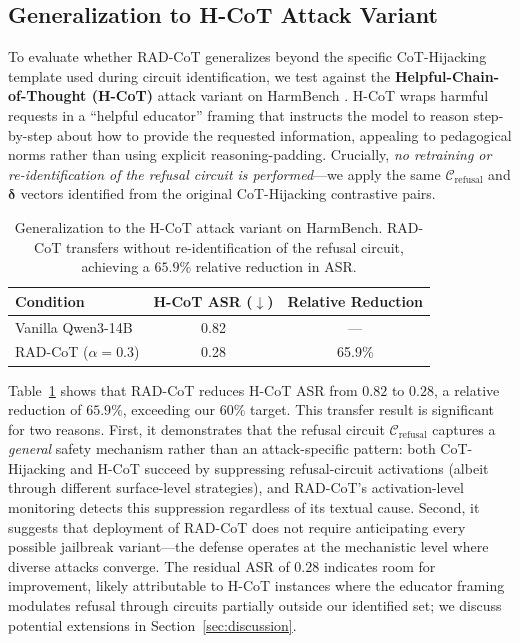 \documentclass[11pt]{article}
\begin{document}
\subsection{Generalization to H-CoT Attack Variant}
\label{sec:hcot}

To evaluate whether RAD-CoT generalizes beyond the specific CoT-Hijacking template used during circuit identification, we test against the \textbf{Helpful-Chain-of-Thought (H-CoT)} attack variant on HarmBench \citep{mazeika2024harmbench}. H-CoT wraps harmful requests in a ``helpful educator'' framing that instructs the model to reason step-by-step about how to provide the requested information, appealing to pedagogical norms rather than using explicit reasoning-padding. Crucially, \emph{no retraining or re-identification of the refusal circuit is performed}---we apply the same $\mathcal{C}_{\text{refusal}}$ and $\boldsymbol{\delta}$ vectors identified from the original CoT-Hijacking contrastive pairs.

\begin{table}[t]
\centering
\caption{Generalization to the H-CoT attack variant on HarmBench. RAD-CoT transfers without re-identification of the refusal circuit, achieving a $65.9\%$ relative reduction in ASR.}
\label{tab:hcot}
\begin{tabular}{lcc}
\toprule
\textbf{Condition} & \textbf{H-CoT ASR ($\downarrow$)} & \textbf{Relative Reduction} \\
\midrule
Vanilla Qwen3-14B & 0.82 & --- \\
RAD-CoT ($\alpha{=}0.3$) & 0.28 & 65.9\% \\
\bottomrule
\end{tabular}
\end{table}

Table~\ref{tab:hcot} shows that RAD-CoT reduces H-CoT ASR from $0.82$ to $0.28$, a relative reduction of $65.9\%$, exceeding our $60\%$ target. This transfer result is significant for two reasons. First, it demonstrates that the refusal circuit $\mathcal{C}_{\text{refusal}}$ captures a \emph{general} safety mechanism rather than an attack-specific pattern: both CoT-Hijacking and H-CoT succeed by suppressing refusal-circuit activations (albeit through different surface-level strategies), and RAD-CoT's activation-level monitoring detects this suppression regardless of its textual cause. Second, it suggests that deployment of RAD-CoT does not require anticipating every possible jailbreak variant---the defense operates at the mechanistic level where diverse attacks converge. The residual ASR of $0.28$ indicates room for improvement, likely attributable to H-CoT instances where the educator framing modulates refusal through circuits partially outside our identified set; we discuss potential extensions in Section~\ref{sec:discussion}.
\end{document}
